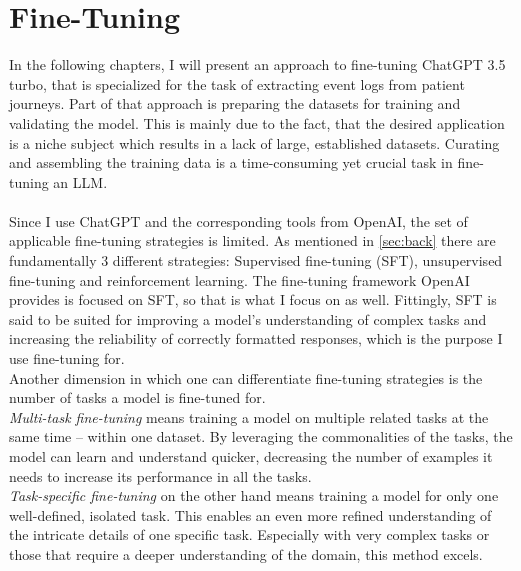 \section{Fine-Tuning}\label{sec:fine}
In the following chapters, I will present an approach to fine-tuning ChatGPT 3.5 turbo, that is specialized for the task of extracting event logs from patient journeys. Part of that approach is preparing the datasets for training and validating the model. This is mainly due to the fact, that the desired application is a niche subject which results in a lack of large, established datasets. Curating and assembling the training data is a time-consuming yet crucial task in fine-tuning an LLM.\\\\
Since I use ChatGPT and the corresponding tools from OpenAI, the set of applicable fine-tuning strategies is limited. As mentioned in \ref{sec:back} there are fundamentally 3 different strategies: Supervised fine-tuning (SFT), unsupervised fine-tuning and reinforcement learning. The fine-tuning framework OpenAI provides is focused on SFT, so that is what I focus on as well. Fittingly, SFT is said to be suited for improving a model's understanding of complex tasks and increasing the reliability of correctly formatted responses, which is the purpose I use fine-tuning for.\\
Another dimension in which one can differentiate fine-tuning strategies is the number of tasks a model is fine-tuned for.\\
\emph{Multi-task fine-tuning} means training a model on multiple related tasks at the same time – within one dataset. By leveraging the commonalities of the tasks, the model can learn and understand quicker, decreasing the number of examples it needs to increase its performance in all the tasks.\\
\emph{Task-specific fine-tuning} on the other hand means training a model for only one well-defined, isolated task. This enables an even more refined understanding of the intricate details of one specific task. Especially with very complex tasks or those that require a deeper understanding of the domain, this method excels.\\\\
